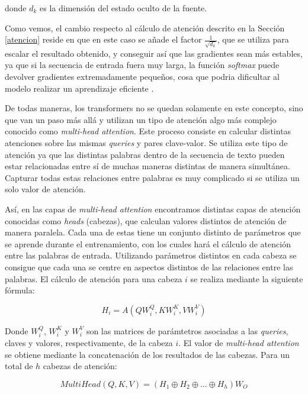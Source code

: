 \documentclass[11pt,spanish,listoffigures,listoftables]{tfgetsinf}
\begin{document}
donde $d_k$ es la dimensión del estado oculto de la fuente.

Como vemos, el cambio respecto al cálculo de atención descrito en la Sección \ref{atencion} reside en que en este caso se añade el factor $\frac{1}{\sqrt{d_k}}$, que se utiliza para escalar el resultado obtenido, y conseguir así que las gradientes sean más estables, ya que si la secuencia de entrada fuera muy larga, la función \textit{softmax} puede devolver gradientes extremadamente pequeños, cosa que podria dificultar al modelo realizar un aprendizaje eficiente \cite{multiheaddotproduct}.

De todas maneras, los transformers no se quedan solamente en este concepto, sino que van un paso más allá y utilizan un tipo de atención algo más complejo conocido como \textit{multi-head attention}. Este proceso consiste en calcular distintas atenciones sobre las mismas \textit{queries} y pares clave-valor. Se utiliza este tipo de atención ya que las distintas palabras dentro de la secuencia de texto pueden estar relacionadas entre sí de muchas maneras distintas de manera simultánea. Capturar todas estas relaciones entre palabras es muy complicado si se utiliza un solo valor de atención.

Así, en las capas de \textit{multi-head attention} encontramos distintas capas de atención conocidas como \textit{heads} (cabezas), que calculan valores distintos de atención de manera paralela. Cada una de estas tiene un conjunto distinto de parámetros que se aprende durante el entrenamiento, con los cuales hará el cálculo de atención entre las palabras de entrada. Utilizando parámetros distintos en cada cabeza se consigue que cada una se centre en aspectos distintos de las relaciones entre las palabras. El cálculo de atención para una cabeza $i$ se realiza mediante la siguiente fórmula:

\begin{equation}
H_i = A(QW_i^Q, KW_i^K, VW_i^V)
\end{equation}

Donde $W_i^Q$, $W_i^K$ y $W_i^V$ son las matrices de parámtetros asociadas a las \textit{queries}, claves y valores, respectivamente, de la cabeza $i$. El valor de \textit{multi-head attention} se obtiene mediante la concatenación de los resultados de las cabezas. Para un total de $h$ cabezas de atención:

\begin{equation}
MultiHead(Q, K, V) = (H_1 \oplus H_2 \oplus ... \oplus H_h)W_O
\end{equation}
\end{document}
